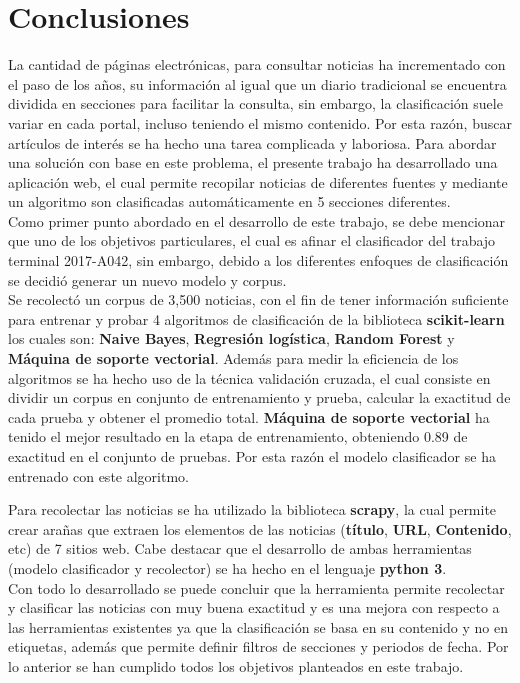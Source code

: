 \section{Conclusiones}
La cantidad de páginas electrónicas, para consultar noticias ha incrementado con el paso de los años, su información al igual que un diario tradicional se encuentra dividida en secciones para facilitar 
la consulta, sin embargo, la clasificación suele variar en cada portal, incluso teniendo el mismo contenido. Por esta razón, buscar artículos de interés se ha hecho una tarea complicada y laboriosa. Para abordar una solución con base en este problema, el presente trabajo ha desarrollado
una aplicación web, el cual permite recopilar noticias de diferentes fuentes y mediante un algoritmo son clasificadas automáticamente en 5 secciones diferentes.\\

Como primer punto abordado en el desarrollo de este trabajo, se debe mencionar que uno de los objetivos particulares, el cual es afinar el clasificador del trabajo terminal 2017-A042, sin embargo, debido a los diferentes enfoques de clasificación se decidió generar un nuevo modelo y corpus.\\ 

Se recolectó un corpus de 3,500 noticias, con el fin de tener información suficiente para entrenar y probar 4 algoritmos de clasificación de la biblioteca \textbf{scikit-learn} los cuales son: \textbf{Naive Bayes}, \textbf{Regresión logística}, \textbf{Random Forest} y \textbf{Máquina de soporte vectorial}. Además para medir la eficiencia de los algoritmos se ha hecho uso de la técnica validación cruzada, el cual consiste en dividir un corpus en conjunto de entrenamiento y prueba, calcular la exactitud de cada prueba y obtener el promedio total. \textbf{Máquina de soporte vectorial} ha tenido el mejor resultado en la etapa de entrenamiento, obteniendo 0.89 de exactitud en el conjunto de pruebas. Por esta razón el modelo clasificador se ha entrenado con este algoritmo. 

Para recolectar las noticias se ha utilizado la biblioteca \textbf{scrapy}, la cual permite crear arañas que extraen los elementos de las noticias (\textbf{título}, \textbf{URL}, \textbf{Contenido}, etc) de 7 sitios web. Cabe destacar que el desarrollo de ambas herramientas (modelo clasificador y recolector) se ha hecho en el lenguaje \textbf{python 3}.\\


Con todo lo desarrollado se puede concluir que la herramienta permite recolectar y clasificar las noticias con muy buena exactitud y es una mejora con respecto a las herramientas existentes ya que la clasificación se basa en su contenido y no en etiquetas, además que permite definir filtros de secciones y periodos de fecha. Por lo anterior se han cumplido todos los objetivos planteados en este trabajo.


